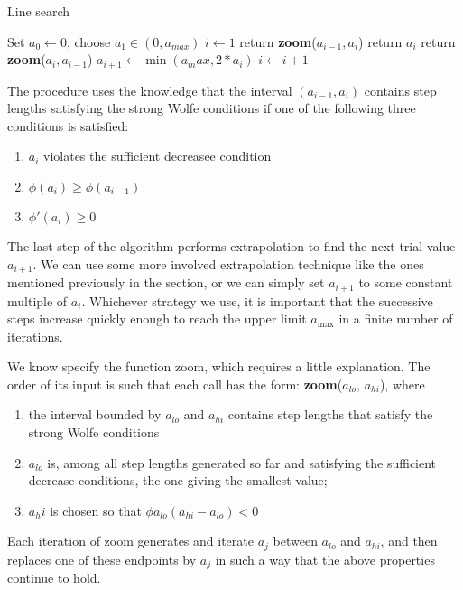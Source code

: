 \documentclass[11pt]{article}
\begin{document}
    \begin{algorithm}
        \caption{Line search}
        \label{alg:linesearh}
        \begin{algorithmic}
            \State Set $a_0 \gets 0$, choose $a_1 \in (0, a_{max})$
            \State $i \gets 1$
            \Repeat
                    \State return \textbf{zoom}($a_{i-1}, a_i$)
                \EndIf
                    \State return $a_i$
                \EndIf
                    \State return \textbf{zoom}($a_i, a_{i-1}$)
                \EndIf
                \State $a_{i+1} \gets \min({a_max, 2*a_i})$
                \State $i \gets i+1$
            \Until
        \end{algorithmic}
    \end{algorithm}

    The procedure uses the knowledge that the interval $(a_{i-1} , a_{i})$ contains step lengths satisfying the strong Wolfe
    conditions if one of the following three conditions is satisfied:
    \begin{enumerate}
        \item $a_i$ violates the sufficient decreasee condition
        \item $\phi(a_i) \geq \phi(a_{i-1}) $
        \item $\phi'(a_i) \geq 0$
    \end{enumerate}
    The last step of the algorithm performs extrapolation to find the next trial value $a_{i+1}$.
    We can use some more involved extrapolation technique like the ones mentioned previously in the section, or
    we can simply set $a_{i+1}$ to some constant multiple of $a_i$.
    Whichever strategy we use, it is
    important that the successive steps increase quickly enough to reach the upper limit $a_{\max}$ in
    a finite number of iterations.

    We know specify the function zoom, which requires a little explanation.
    The order of its input is such that each call has the form: \textbf{zoom}($a_{lo}$, $a_{hi}$), where
    \begin{enumerate}
        \item the interval bounded by $a_{lo}$ and $a_{hi}$ contains step lengths that satisfy the strong Wolfe conditions
        \item $a_{lo}$ is, among all step lengths generated so far and satisfying the sufficient decrease conditions, the one giving the smallest value;
        \item $a_hi$ is chosen so that $\phi{a_{lo}}(a_{hi} - a_{lo}) < 0$
    \end{enumerate}
    Each iteration of zoom generates and iterate $a_j$ between $a_{lo}$ and $a_{hi}$, and then replaces one of these
    endpoints by $a_j$ in such a way that the above properties continue to hold.
\end{document}
